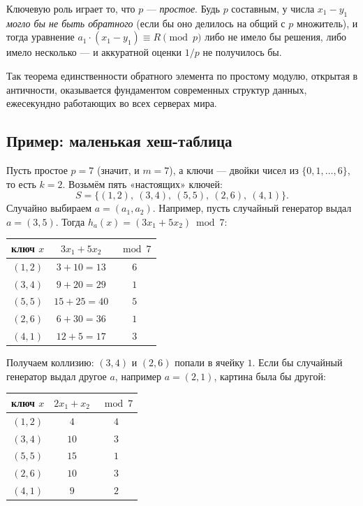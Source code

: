 \begin{importantbox}[title={Важно: почему именно простое $p$}]
Ключевую роль играет то, что $p$ --- \emph{простое}. Будь $p$ составным, у числа $x_1 - y_1$ \emph{могло бы не быть обратного} (если бы оно делилось на общий с $p$ множитель), и тогда уравнение $a_1 \cdot (x_1 - y_1) \equiv R \pmod p$ либо не имело бы решения, либо имело несколько --- и аккуратной оценки $1/p$ не получилось бы.

Так теорема единственности обратного элемента по простому модулю, открытая в античности, оказывается фундаментом современных структур данных, ежесекундно работающих во всех серверах мира.
\end{importantbox}

\subsection{Пример: маленькая хеш-таблица}

Пусть простое $p = 7$ (значит, и $m = 7$), а ключи --- двойки чисел из $\{0, 1, \dots, 6\}$, то есть $k = 2$. Возьмём пять «настоящих» ключей:
\[
  S = \{(1, 2),\ (3, 4),\ (5, 5),\ (2, 6),\ (4, 1)\}.
\]
Случайно выбираем $a = (a_1, a_2)$. Например, пусть случайный генератор выдал $a = (3, 5)$. Тогда $h_a(x) = (3 x_1 + 5 x_2) \bmod 7$:

\begin{center}
\renewcommand{\arraystretch}{1.25}
\begin{tabular}{ccc}
\rowcolor{prosvLight}
ключ $x$ & $3 x_1 + 5 x_2$ & $\bmod 7$ \\
\hline
$(1, 2)$ & $3 + 10 = 13$  & $6$ \\
$(3, 4)$ & $9 + 20 = 29$  & $1$ \\
$(5, 5)$ & $15 + 25 = 40$ & $5$ \\
$(2, 6)$ & $6 + 30 = 36$  & $1$ \\
$(4, 1)$ & $12 + 5 = 17$  & $3$ \\
\end{tabular}
\end{center}

Получаем коллизию: $(3,4)$ и $(2,6)$ попали в ячейку $1$. Если бы случайный генератор выдал другое $a$, например $a = (2, 1)$, картина была бы другой:

\begin{center}
\renewcommand{\arraystretch}{1.25}
\begin{tabular}{ccc}
\rowcolor{prosvLight}
ключ $x$ & $2 x_1 + x_2$ & $\bmod 7$ \\
\hline
$(1, 2)$ & $4$  & $4$ \\
$(3, 4)$ & $10$ & $3$ \\
$(5, 5)$ & $15$ & $1$ \\
$(2, 6)$ & $10$ & $3$ \\
$(4, 1)$ & $9$  & $2$ \\
\end{tabular}
\end{center}

